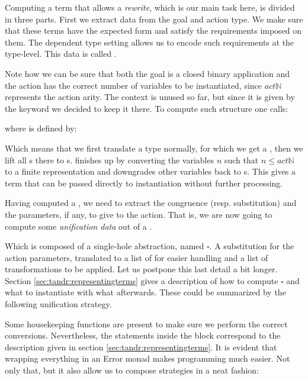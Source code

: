 Computing a term that allows a \emph{rewrite}, which is our main task here, is divided in three parts. First we extract data from the goal and action type. We
make sure that these terms have the expected form and satisfy the requirements
imposed on them. The dependent type setting allows us to encode such requirements
at the type-level. This data is called .


Note how we can be sure that both the goal is a closed binary application and the action has the correct number of variables to be instantiated, since $act\mathbb{N}$ represents the action arity. The context is unused so far, but since
it is given by the  keyword we decided to keep it there. To compute such structure one calls:


where  is defined by:


Which means that we first translate a type normally, for which we get a , then we lift all s there to s.  finishes up by converting the variables $n$ such that $n \le act\mathbb{N}$ to a finite
representation and downgrades other variables back to s. This
gives a term that can be passed directly to instantiation without further processing.

Having computed a , we need to extract the congruence (resp. substitution) and the parameters, if any, to give to the action. That is, we are now going to compute some \emph{unification data} out of a .


Which is composed of a single-hole abstraction, named $\square$. A substitution
for the action parameters, translated to a list of  for easier handling and a list of transformations to be applied. Let us postpone this last detail a bit longer. Section \ref{sec:tandr:representingterms} gives a description of how to compute $\square$ and what to instantiate with what afterwards. These could be summarized by the
following unification strategy.


Some housekeeping functions are present to make sure we perform the correct
conversions. Nevertheless, the statements inside the  block correspond to the description given in section \ref{sec:tandr:representingterms}. It is
 evident that wrapping everything in an Error monad makes programming much easier. Not only that, but it also allow us to compose strategies in a neat fashion:
 
